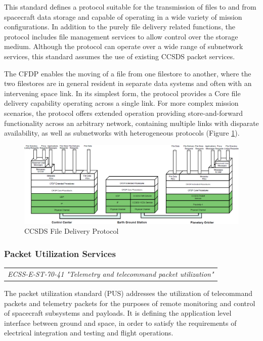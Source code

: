 This standard defines a protocol suitable for the transmission of files to and from spacecraft data storage and capable of operating in a wide variety of mission configurations. In addition to the purely file delivery related functions, the protocol includes file management services to allow control over the storage medium. Although the protocol can operate over a wide range of subnetwork services, this standard assumes the use of existing CCSDS packet services. 

The CFDP enables the moving of a file from one filestore to another, where the two filestores are in general resident in separate data systems and often with an intervening space link. In its simplest form, the protocol provides a Core file delivery capability operating across a single link. For more complex mission scenarios, the protocol offers extended operation providing store-and-forward functionality across an arbitrary network, containing multiple links with disparate availability, as well as subnetworks with heterogeneous protocols (Figure \ref{fig:CCSDS File Delivery Protocol}).

\begin{figure}[h]
\centering\includegraphics[scale=0.4]{fig/cfdp}
\caption{CCSDS File Delivery Protocol}
\label{fig:CCSDS File Delivery Protocol}
\end{figure}

\subsubsection{Packet Utilization Services}

\begin{tabular}{l}
\textit{ECSS-E-ST-70-41 "Telemetry and telecommand packet utilization" \cite{ECSS-E-ST-70-41}} \\
\end{tabular}

The packet utilization standard (PUS) addresses the utilization of telecommand packets and telemetry packets for the purposes of remote monitoring and control of spacecraft subsystems and payloads. It is defining the application level interface between ground and space, in order to satisfy the requirements of electrical integration and testing and flight operations.


